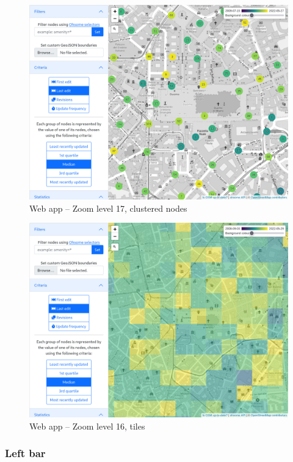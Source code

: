 \documentclass{Configuration_Files/PoliMi3i_thesis}
\begin{document}
\begin{figure}[ht]
    \centering
    \includegraphics[width=1\textwidth]{Images/level17.png}
    \caption{Web app – Zoom level 17, clustered nodes}
    \label{fig:level17}
\end{figure}

\begin{figure}[ht]
    \centering
    \includegraphics[width=1\textwidth]{Images/level16.png}
    \caption{Web app – Zoom level 16, tiles}
    \label{fig:level16}
\end{figure}

\subsubsection{Left bar}
\end{document}
